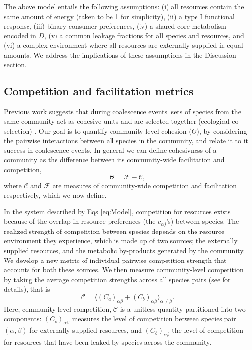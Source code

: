 \documentclass[10pt,letterpaper]{article}
\begin{document}
The above model entails the following assumptions: (i) all resources contain the same amount of energy (taken to be 1 for simplicity), (ii) a type I functional response, (iii) binary consumer preferences, (iv) a shared core metabolism encoded in $D$, (v) a common leakage fractions for all species and resources, and (vi) a complex environment where all resources are externally supplied in equal amounts. We address the implications of these assumptions in the Discussion section.  

\subsection*{Competition and facilitation metrics}

Previous work suggests that during coalescence events, sets of species from the same community act as cohesive units and are selected together (ecological co-selection) \cite{Gilpin1994, Toquenaga1997, Tikhonov2016, Sierocinski2017, Lu2018}. Our goal is to quantify community-level cohesion ($\Theta$), by considering the pairwise interactions between all species in the community, and relate it to it success in coalescence events. In general we can define cohesivness of a community as the difference between its community-wide facilitation and competition,
\begin{equation}\label{eq:cohesion}
    \Theta = \mathcal{F} - \mathcal{C},
\end{equation}
where $\mathcal{C}$ and $\mathcal{F}$ are measures of community-wide competition and facilitation respectively, which we now define.

In the system described by Eqs \ref{eq:Model}, competition for resources exists because of the overlap in resource preferences (the $c_{\alpha j}$'s) between species. The realized strength of competition between species depends on the resource environment they experience, which is made up of two sources; the externally supplied resources, and the metabolic by-products generated by the community. We develop a new metric of individual pairwise competition strength that accounts for both these sources. We then measure community-level competition by taking the average competition strengths across all species pairs (see  for details), that is
\begin{equation}\label{eq:competition}
    \mathcal{C} = \langle(C_a)_{\alpha \beta} + (C_b)_{\alpha \beta}\rangle_{\alpha \neq \beta}.
\end{equation}
Here, community-level competition, $\mathcal{C}$ is a unitless quantity partitioned into two components: $(C_a)_{\alpha \beta}$ measures the level of competition between species pair $(\alpha, \beta)$ for externally supplied resources, and $(C_b)_{\alpha \beta}$ the level of  competition for resources that have been leaked by species across the community. 
\end{document}
